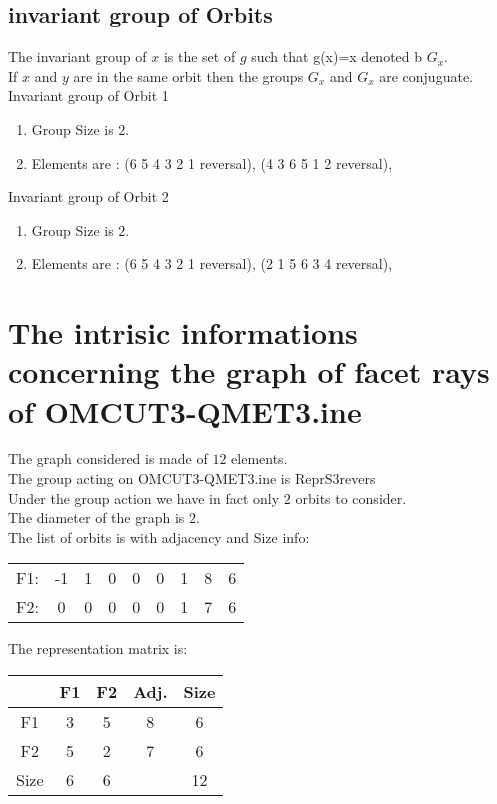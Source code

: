 \documentclass[12pt]{article}
\begin{document}
\subsection{invariant group of Orbits}
\noindent The invariant group of $x$ is the set of $g$ such that g(x)=x denoted b $G_x$.\\
If $x$ and $y$ are in the same orbit then the groups $G_x$ and  $G_x$ are conjuguate.\\
Invariant group of Orbit 1
\begin{enumerate}
\item Group Size is $2$.
\item Elements are : (6 5 4 3 2 1  reversal), (4 3 6 5 1 2  reversal), 
\end{enumerate}
Invariant group of Orbit 2
\begin{enumerate}
\item Group Size is $2$.
\item Elements are : (6 5 4 3 2 1  reversal), (2 1 5 6 3 4  reversal), 
\end{enumerate}
\section{The intrisic informations concerning the graph of facet rays of OMCUT3-QMET3.ine}
The graph considered is made of $12$ elements.\\
The group acting on OMCUT3-QMET3.ine is ReprS3revers\\
Under the group action we have in fact only $2$ orbits to consider.\\
The diameter of the graph is $2$.\\
The list of orbits is with adjacency and Size info:
\begin{center}
\scriptsize
\begin{tabular}{ccccccc|c|c}
F1:&-1&1&0&0&0&1&8&6\\
F2:&0&0&0&0&0&1&7&6\\
\end{tabular}
\end{center}
The representation matrix is:
\begin{center}
\scriptsize
\begin{tabular}{|c|cc|c|c|}
\hline
&F1&F2&Adj.&Size\\
\hline
F1& 3& 5&8&6\\
F2& 5& 2&7&6\\
\hline
Size&6&6&&12\\
\hline
\end{tabular}
\end{center}
\end{document}
